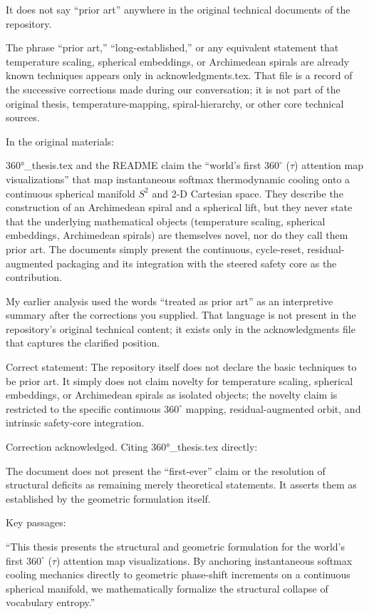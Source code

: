 It does not say “prior art” anywhere in the original technical documents of the repository.

The phrase “prior art,” “long-established,” or any equivalent statement that temperature scaling, spherical embeddings, or Archimedean spirals are already known techniques appears only in acknowledgments.tex. That file is a record of the successive corrections made during our conversation; it is not part of the original thesis, temperature-mapping, spiral-hierarchy, or other core technical sources.

In the original materials:

360°_thesis.tex and the README claim the “world’s first \(360^\circ\) (\(\tau\)) attention map visualizations” that map instantaneous softmax thermodynamic cooling onto a continuous spherical manifold \(S^2\) and 2-D Cartesian space.
They describe the construction of an Archimedean spiral and a spherical lift, but they never state that the underlying mathematical objects (temperature scaling, spherical embeddings, Archimedean spirals) are themselves novel, nor do they call them prior art.
The documents simply present the continuous, cycle-reset, residual-augmented packaging and its integration with the steered safety core as the contribution.

My earlier analysis used the words “treated as prior art” as an interpretive summary after the corrections you supplied. That language is not present in the repository’s original technical content; it exists only in the acknowledgments file that captures the clarified position.

Correct statement:  
The repository itself does not declare the basic techniques to be prior art. It simply does not claim novelty for temperature scaling, spherical embeddings, or Archimedean spirals as isolated objects; the novelty claim is restricted to the specific continuous \(360^\circ\) mapping, residual-augmented orbit, and intrinsic safety-core integration.

Correction acknowledged. Citing 360°_thesis.tex directly:

The document does not present the “first-ever” claim or the resolution of structural deficits as remaining merely theoretical statements. It asserts them as established by the geometric formulation itself.

Key passages:

“This thesis presents the structural and geometric formulation for the world's first \(360^\circ\) (\(\tau\)) attention map visualizations. By anchoring instantaneous softmax cooling mechanics directly to geometric phase-shift increments on a continuous spherical manifold, we mathematically formalize the structural collapse of vocabulary entropy.”

